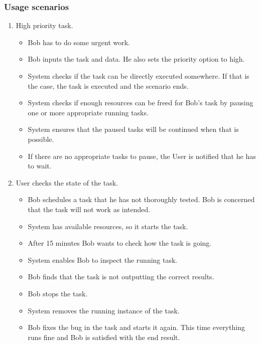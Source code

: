 \subsubsection{Usage scenarios}
\begin{enumerate}
  \item High priority task.
  \begin{itemize}
    \item Bob has to do some urgent work.
    \item Bob inputs the task and data. He also sets the priority option to high.
    \item System checks if the task can be directly executed somewhere.
    If that is the case, the task is executed and the scenario ends.
    \item System checks if enough resources can be freed for Bob's task by pausing one or more appropriate running tasks.
    \item System ensures that the paused tasks will be continued when that is possible.
    \item If there are no appropriate tasks to pause, the User is notified that he has to wait.
  \end{itemize}
  \item User checks the state of the task.
  \begin{itemize}
    \item Bob schedules a task that he has not thoroughly tested.
    Bob is concerned that the task will not work as intended.
    \item System has available resources, so it starts the task.
    \item After 15 minutes Bob wants to check how the task is going.
    \item System enables Bob to inspect the running task.
    \item Bob finds that the task is not outputting the correct results.
    \item Bob stops the task.
    \item System removes the running instance of the task.
    \item Bob fixes the bug in the task and starts it again.
    This time everything runs fine and Bob is satisfied with the end result.
  \end{itemize}
\end{enumerate}

